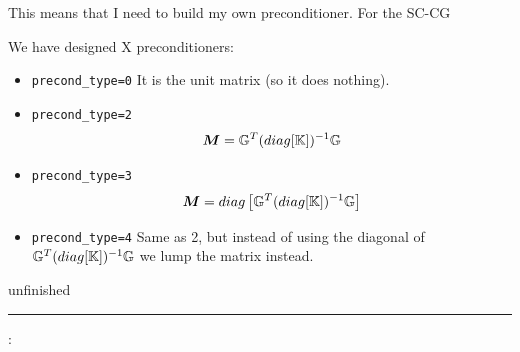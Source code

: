 This means that I need to build my own preconditioner. 
For the SC-CG 

We have designed X preconditioners:
\begin{itemize}
\item {\tt precond\_type=0} It is the unit matrix (so it does nothing). 

\item {\tt precond\_type=2}
\[
{\bm M} = {\mathbb{G}}^T (diag [{\mathbb{K}}]  )^{-1} {\mathbb{G}} 
\]
\item {\tt precond\_type=3} 
\[
{\bm M} = diag \left[ {\mathbb{G}}^T (diag [{\mathbb{K}}]  )^{-1} {\mathbb{G}} \right]
\]
\item {\tt precond\_type=4} Same as 2, but instead of using the 
diagonal of $ {\mathbb{G}}^T (diag [{\mathbb{K}}]  )^{-1} {\mathbb{G}}$ we lump the matrix instead.

\end{itemize}

{\Large unfinished}



\par\noindent\rule{\textwidth}{0.4pt}

\vspace{.5cm}

\begin{center}
\end{center}

\vspace{.5cm}

\Literature:\\







